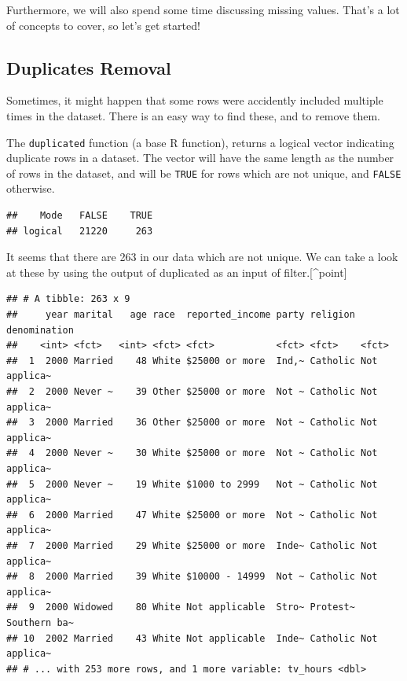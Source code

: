 \documentclass[]{tufte-book}
\newenvironment{Shaded}{}{}
\newcommand{\KeywordTok}[1]{\textcolor[rgb]{0.00,0.44,0.13}{\textbf{#1}}}
\newcommand{\NormalTok}[1]{#1}
\newcommand{\OperatorTok}[1]{\textcolor[rgb]{0.40,0.40,0.40}{#1}}
\newcommand{\StringTok}[1]{\textcolor[rgb]{0.25,0.44,0.63}{#1}}
\begin{document}
Furthermore, we will also spend some time discussing missing values. That's a lot of concepts to cover, so let's get started!

\hypertarget{duplicates-removal}{%
\subsection{Duplicates Removal}\label{duplicates-removal}}

Sometimes, it might happen that some rows were accidently included multiple times in the dataset. There is an easy way to find these, and to remove them.

The \texttt{duplicated} function (a base R function), returns a logical vector indicating duplicate rows in a dataset. The vector will have the same length as the number of rows in the dataset, and will be \texttt{TRUE} for rows which are not unique, and \texttt{FALSE} otherwise.

\begin{Shaded}
\end{Shaded}

\begin{verbatim}
##    Mode   FALSE    TRUE 
## logical   21220     263
\end{verbatim}

It seems that there are 263 in our data which are not unique. We can take a look at these by using the output of duplicated as an input of filter.{[}\^{}point{]}

\begin{Shaded}
\end{Shaded}

\begin{verbatim}
## # A tibble: 263 x 9
##     year marital   age race  reported_income party religion denomination
##    <int> <fct>   <int> <fct> <fct>           <fct> <fct>    <fct>       
##  1  2000 Married    48 White $25000 or more  Ind,~ Catholic Not applica~
##  2  2000 Never ~    39 Other $25000 or more  Not ~ Catholic Not applica~
##  3  2000 Married    36 Other $25000 or more  Not ~ Catholic Not applica~
##  4  2000 Never ~    30 White $25000 or more  Not ~ Catholic Not applica~
##  5  2000 Never ~    19 White $1000 to 2999   Not ~ Catholic Not applica~
##  6  2000 Married    47 White $25000 or more  Not ~ Catholic Not applica~
##  7  2000 Married    29 White $25000 or more  Inde~ Catholic Not applica~
##  8  2000 Married    39 White $10000 - 14999  Not ~ Catholic Not applica~
##  9  2000 Widowed    80 White Not applicable  Stro~ Protest~ Southern ba~
## 10  2002 Married    43 White Not applicable  Inde~ Catholic Not applica~
## # ... with 253 more rows, and 1 more variable: tv_hours <dbl>
\end{verbatim}
\end{document}
